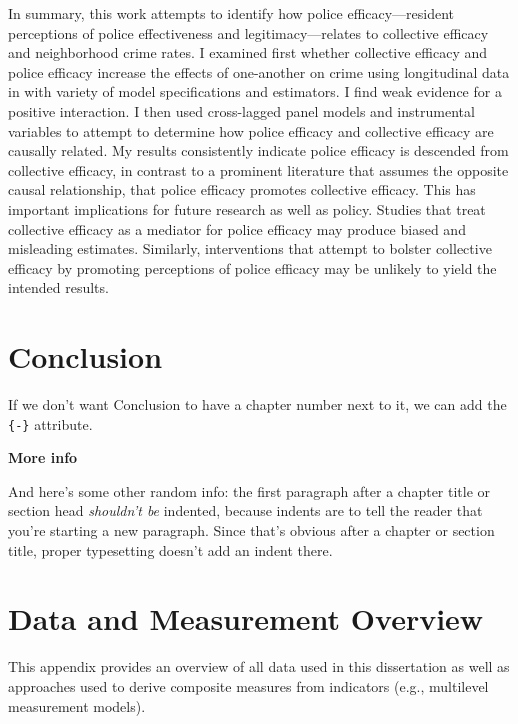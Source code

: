 \documentclass [11pt, proquest] {uwthesis}[2015/03/03]
\begin{document}
In summary, this work attempts to identify how police efficacy---resident perceptions of police effectiveness and legitimacy---relates to collective efficacy and neighborhood crime rates. I examined first whether collective efficacy and police efficacy increase the effects of one-another on crime using longitudinal data in with variety of model specifications and estimators. I find weak evidence for a positive interaction. I then used cross-lagged panel models and instrumental variables to attempt to determine how police efficacy and collective efficacy are causally related. My results consistently indicate police efficacy is descended from collective efficacy, in contrast to a prominent literature that assumes the opposite causal relationship, that police efficacy promotes collective efficacy. This has important implications for future research as well as policy. Studies that treat collective efficacy as a mediator for police efficacy may produce biased and misleading estimates. Similarly, interventions that attempt to bolster collective efficacy by promoting perceptions of police efficacy may be unlikely to yield the intended results.

\hypertarget{conclusion}{%
\chapter*{Conclusion}\label{conclusion}}

If we don't want Conclusion to have a chapter number next to it, we can add the \texttt{\{-\}} attribute.

\textbf{More info}

And here's some other random info: the first paragraph after a chapter title or section head \emph{shouldn't be} indented, because indents are to tell the reader that you're starting a new paragraph. Since that's obvious after a chapter or section title, proper typesetting doesn't add an indent there.

\appendix

\hypertarget{measures}{%
\chapter{Data and Measurement Overview}\label{measures}}

This appendix provides an overview of all data used in this dissertation as well as approaches used to derive composite measures from indicators (e.g., multilevel measurement models).
\end{document}

